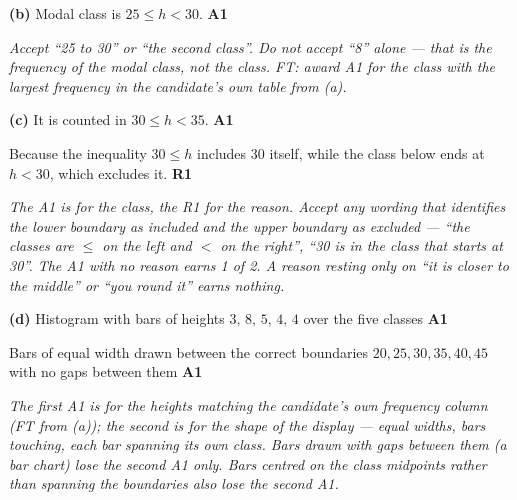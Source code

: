 \documentclass[12pt, twoside]{article}
\begin{document}
\begin{enumerate}[itemsep=0.3cm]
\textbf{(b)} Modal class is $25 \le h < 30$. \hfill \textbf{A1}

\emph{Accept ``25 to 30'' or ``the second class''. Do not accept ``8''
alone --- that is the frequency of the modal class, not the class.
FT: award A1 for the class with the largest frequency in the candidate's
own table from (a).}

\textbf{(c)} It is counted in $30 \le h < 35$. \hfill \textbf{A1}

Because the inequality $30 \le h$ includes 30 itself, while the class
below ends at $h < 30$, which excludes it. \hfill \textbf{R1}

\emph{The A1 is for the class, the R1 for the reason.
Accept any wording that identifies the lower boundary as included and the
upper boundary as excluded --- ``the classes are $\le$ on the left and
$<$ on the right'', ``30 is in the class that starts at 30''. The A1 with
no reason earns 1 of 2. A reason resting only on ``it is closer to the
middle'' or ``you round it'' earns nothing.}

\textbf{(d)} Histogram with bars of heights $3,\, 8,\, 5,\, 4,\, 4$ over
the five classes \hfill \textbf{A1}

Bars of equal width drawn between the correct boundaries
$20,25,30,35,40,45$ with no gaps between them \hfill \textbf{A1}

\emph{The first A1 is for the heights matching the candidate's own
frequency column (FT from (a)); the second is for the shape of the
display --- equal widths, bars touching, each bar spanning its own class.
Bars drawn with gaps between them (a bar chart) lose the second A1 only.
Bars centred on the class midpoints rather than
spanning the boundaries also lose the second A1.}

\vspace{-0.35cm}

\begin{center}
\end{center}

\end{enumerate}
\end{document}

